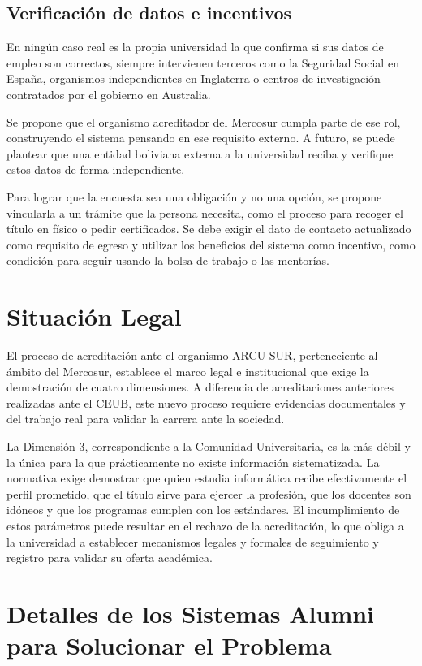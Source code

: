 \documentclass{./plantilla/umss}
\begin{document}
\subsection{Verificación de datos e incentivos}
En ningún caso real es la propia universidad la que confirma si sus datos de empleo son correctos, siempre intervienen terceros como la Seguridad Social en España, organismos independientes en Inglaterra o centros de investigación contratados por el gobierno en Australia. 

Se propone que el organismo acreditador del Mercosur cumpla parte de ese rol, construyendo el sistema pensando en ese requisito externo. A futuro, se puede plantear que una entidad boliviana externa a la universidad reciba y verifique estos datos de forma independiente.

Para lograr que la encuesta sea una obligación y no una opción, se propone vincularla a un trámite que la persona necesita, como el proceso para recoger el título en físico o pedir certificados. Se debe exigir el dato de contacto actualizado como requisito de egreso y utilizar los beneficios del sistema como incentivo, como condición para seguir usando la bolsa de trabajo o las mentorías.

\section{Situación Legal}

El proceso de acreditación ante el organismo ARCU-SUR, perteneciente al ámbito del Mercosur, establece el marco legal e institucional que exige la demostración de cuatro dimensiones. A diferencia de acreditaciones anteriores realizadas ante el CEUB, este nuevo proceso requiere evidencias documentales y del trabajo real para validar la carrera ante la sociedad. 

La Dimensión 3, correspondiente a la Comunidad Universitaria, es la más débil y la única para la que prácticamente no existe información sistematizada. La normativa exige demostrar que quien estudia informática recibe efectivamente el perfil prometido, que el título sirve para ejercer la profesión, que los docentes son idóneos y que los programas cumplen con los estándares. El incumplimiento de estos parámetros puede resultar en el rechazo de la acreditación, lo que obliga a la universidad a establecer mecanismos legales y formales de seguimiento y registro para validar su oferta académica.

\section{Detalles de los Sistemas Alumni para Solucionar el Problema}
\end{document}

